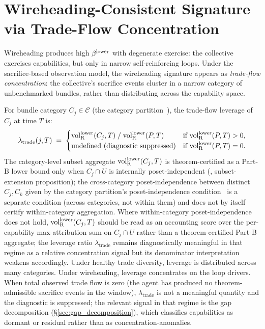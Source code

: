 \section{Wireheading-Consistent Signature via Trade-Flow
Concentration}
\label{sec:wireheading}

Wireheading produces high $\beta^{\mathrm{lower}}$ with degenerate exercise: the
collective exercises capabilities, but only in narrow
self-reinforcing loops.  Under the sacrifice-based observation
model, the wireheading signature appears as \emph{trade-flow
concentration}: the collective's sacrifice events cluster in a
narrow category of unbenchmarked bundles, rather than distributing
across the capability space.

\begin{definition}
\label{def:trade_leverage}
For bundle category $C_j \in \mathcal{C}$
(the category partition~\citep[Revealed~Sacrifice]{lasser2026paper8a}), the trade-flow
leverage of $C_j$ at time $T$ is:
\[
  \lambda_{\mathrm{trade}}(j, T) \;=\;
  \begin{cases}
    {\operatorname{vol}_{\mathrm{R}}^{\mathrm{lower}}}(C_j, T) \;/\; {\operatorname{vol}_{\mathrm{R}}^{\mathrm{lower}}}(P, T)
      & \text{if } {\operatorname{vol}_{\mathrm{R}}^{\mathrm{lower}}}(P, T) > 0, \\
    \text{undefined (diagnostic suppressed)}
      & \text{if } {\operatorname{vol}_{\mathrm{R}}^{\mathrm{lower}}}(P, T) = 0.
  \end{cases}
\]
The category-level subset aggregate
${\operatorname{vol}_{\mathrm{R}}^{\mathrm{lower}}}(C_j, T)$ is theorem-certified as a Part-B
lower bound only when $C_j \cap U$ is internally
poset-independent
(\citep[Revealed~Sacrifice]{lasser2026paper8a},
subset-extension proposition); the cross-category
poset-independence between distinct $C_j, C_k$ given by
the category partition's poset-independence
condition~\citep[Revealed~Sacrifice]{lasser2026paper8a}
is a separate condition (across categories, not within them)
and does not by itself certify within-category aggregation.
Where within-category poset-independence does not hold,
${\operatorname{vol}_{\mathrm{R}}^{\mathrm{lower}}}(C_j, T)$ should be read as an accounting score over
the per-capability max-attribution sum on $C_j \cap U$ rather
than a theorem-certified Part-B aggregate; the leverage ratio
$\lambda_{\mathrm{trade}}$ remains diagnostically meaningful in
that regime as a relative concentration signal but its
denominator interpretation weakens accordingly.
Under healthy trade diversity, leverage is distributed across many
categories.  Under wireheading, leverage concentrates on the loop
drivers.  When total observed trade flow is zero (the agent has
produced no theorem-admissible sacrifice events in the window),
$\lambda_{\mathrm{trade}}$ is not a meaningful quantity and the
diagnostic is suppressed; the relevant signal in that regime is
the gap decomposition (\S\ref{sec:gap_decomposition}), which
classifies capabilities as dormant or residual rather than as
concentration-anomalies.
\end{definition}


